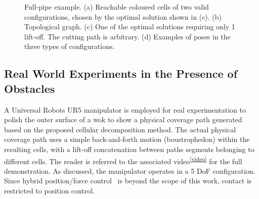 \documentclass[journal]{IEEEtran}
\begin{document}
\begin{figure}[t]
\centering
{}
\caption{Full-pipe example. (a) Reachable coloured cells of two valid configurations, chosen by the optimal solution shown in (c). 
(b) Topological graph. (c) One of the optimal solutions requiring only 1 lift-off. 
The cutting path is arbitrary. (d)  Examples of poses in the three types of configurations.}
\label{fig:fullpipe_sim}
\end{figure}




\subsection{Real World Experiments in the Presence of Obstacles}
\label{sec:real_examples}
A Universal Robots UR5 manipulator is employed for real experimentation to polish the outer surface of a wok to show a physical coverage path generated based on 
the proposed cellular decomposition method. The actual physical coverage path uses a simple back-and-forth motion (boustrophedon) within the resulting cells, 
with a lift-off concatenation between paths segments belonging to different cells. 
The reader is  referred to the associated  video\textsuperscript{\ref{video}} for the full demonstration. %
As discussed, the manipulator operates in a 5 DoF configuration. %
Since hybrid position/force control~\cite{solanes2019robust} is beyond the scope of this work, contact is restricted to position control. 
\end{document}
